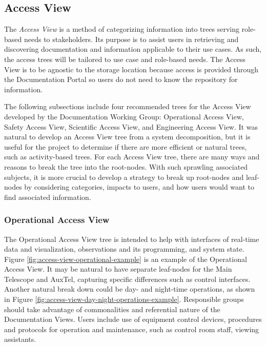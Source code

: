 \subsection{Access View}
\label{sec:access-view}

The \emph{Access View} is a method of categorizing information into trees serving role-based needs to stakeholders.
Its purpose is to assist users in retrieving and discovering documentation and information applicable to their use cases.
As such, the access trees will be tailored to use case and role-based needs.
The Access View is to be agnostic to the storage location because access is provided through the Documentation Portal so users do not need to know the repository for information.

The following subsections include four recommended trees for the Access View developed by the Documentation Working Group: Operational Access View, Safety Access View, Scientific Access View, and Engineering Access View.
It was natural to develop an Access View tree from a system decomposition, but it is useful for the project to determine if there are more efficient or natural trees, such as activity-based trees.
For each Access View tree, there are many ways and reasons to break the tree into the root-nodes.
With such sprawling associated subjects, it is more crucial to develop a strategy to break up root-nodes and leaf-nodes by considering categories, impacts to users, and how users would want to find associated information.

\subsubsection{Operational Access View}

The Operational Access View tree is intended to help with interfaces of real-time data and visualization, observations and its programming, and system state.
Figure \ref{fig:access-view-operational-example} is an example of the Operational Access View.
It may be natural to have separate leaf-nodes for the Main Telescope and AuxTel, capturing specific differences such as control interfaces.
Another natural break down could be day- and night-time operations, as shown in Figure \ref{fig:access-view-day-night-operations-example}.
Responsible groups should take advantage of commonalities and referential nature of the Documentation Views.
Users include use of equipment control devices, procedures and protocols for operation and maintenance, such as control room staff, viewing assistants.

